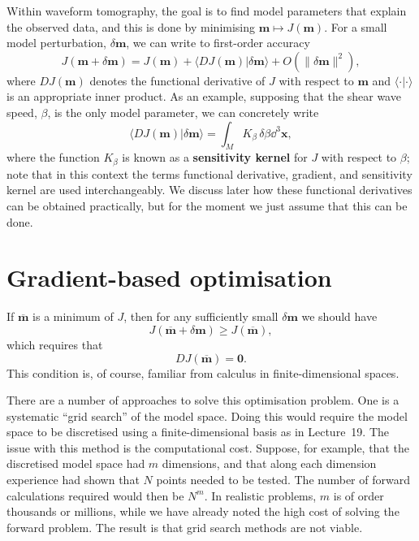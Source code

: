 Within waveform tomography, the goal is to find model parameters that explain the observed data, and this is done by 
minimising $\mathbf{m}\mapsto J(\mathbf{m})$. For a small model perturbation, $\delta \mathbf{m}$, we can write to first-order accuracy
\begin{equation}
J(\mathbf{m}+\delta \mathbf{m})=J(\mathbf{m})+\langle DJ(\mathbf{m})|\delta \mathbf{m}\rangle+O(\|\delta \mathbf{m}\|^{2}),
\label{eq:2}
\end{equation}
where $DJ(\mathbf{m})$ denotes the functional derivative of $J$ with respect to $\mathbf{m}$ and $\langle \cdot | \cdot \rangle$ is an 
appropriate inner product. As an example, supposing that the shear wave speed, $\beta$, is the only model parameter, we can concretely write
\begin{equation}
\langle DJ(\mathbf{m})|\delta \mathbf{m}\rangle=\int_{M}K_{\beta}\,\delta\beta\dd^{3}\mathbf{x},
\label{eq:3}
\end{equation}
where the function $K_{\beta}$ is known as a \textbf{sensitivity kernel} for $J$ with respect to $\beta$; 
note that in this context the terms functional derivative, gradient, and sensitivity kernel are used interchangeably.
We discuss later how these functional derivatives can be obtained practically, but for the moment we just assume that this can be done.

\section*{Gradient-based optimisation}
If $\overline{\mathbf{m}}$ is a minimum of $J$, then for any sufficiently small $\delta \mathbf{m}$ we should have
\begin{equation}
J(\overline{\mathbf{m}}+\delta \mathbf{m})\ge J(\overline{\mathbf{m}}),
\label{eq:4}
\end{equation}
which requires that
\begin{equation}
DJ(\overline{\mathbf{m}})=\mathbf{0}.
\label{eq:5}
\end{equation}
This condition is, of course, familiar from calculus in finite-dimensional spaces. 

There are a number of approaches to solve this optimisation problem. One is a systematic ``grid search'' of the model space. 
Doing this would require the model space to be discretised using a finite-dimensional basis as in Lecture~19. The issue with 
this method is the computational cost. Suppose, for example, that the discretised model space had $m$ dimensions, and that along
each dimension experience had shown that $N$ points needed to be tested. The number of forward calculations required would then be
$N^{m}$. In realistic problems, $m$ is of order thousands or millions, while we have already noted the high cost of solving the 
forward problem. The result is that grid search methods are not viable. 

